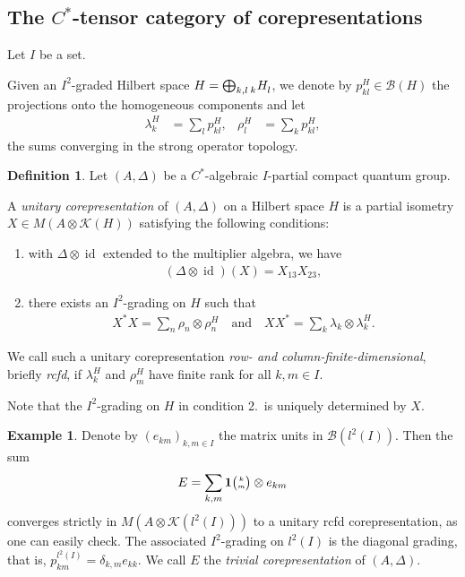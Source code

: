 \documentclass[11pt]{article}
\DeclareMathOperator{\id}{id}
\newcommand{\Grt}[3]{#1{\tiny {\begin{pmatrix} #2\\#3\end{pmatrix}}}}
\newcommand{\UnitC}[2]{\Grt{\mathbf{1}}{#1}{#2}}
\newcommand{\Gr}[5]{\tensor*[^{#2}_{#4}]{#1}{^{#3}_{#5}}}%
\newcommand{\Grd}[3]{\Gr{#1}{}{}{#2}{#3}}
\theoremstyle{definition}
\newtheorem{Def}[Theorem]{Definition}
\newtheorem{Exa}[Theorem]{Example}
\numberwithin{equation}{section}
\begin{document}
\subsection{The $C^{*}$-tensor category of corepresentations}
Let $I$ be a set.

Given an $I^{2}$-graded Hilbert space
$H=\bigoplus_{k,l} \Grd{H}{k}{l}$, we denote by
$p_{kl}^{H} \in \mathcal{B}(H)$ the projections onto the homogeneous components and let
\begin{align*}
  \lambda^{H}_{k} &= \sum_{l} p_{kl}^{H}, &
  \rho^{H}_{l} &= \sum_{k} p_{kl}^{H},
\end{align*}
 the sums converging in the strong operator topology.


 \begin{Def} \label{def:corepresentation} Let $(A,\Delta)$ be a
   $C^{*}$-algebraic $I$-partial compact quantum group. 

   A \emph{unitary corepresentation} of $(A,\Delta)$ on a Hilbert
   space $H$ is a partial isometry $X \in M(A \otimes \mathcal{K}(H))$
   satisfying the following conditions:
   \begin{enumerate}
   \item with $\Delta \otimes \id$ extended to the multiplier algebra, we have
     \begin{align} \label{eq:corep}
     (\Delta \otimes \id)(X) = X_{13}X_{23},  
   \end{align}
 \item there exists an $I^{2}$-grading on $H$ such that
     \begin{align} \label{eq:corep-pi}
       X^{*}X= \sum_{n}\rho_{n} \otimes \rho^{H}_{n} \quad \text{and}
       \quad XX^{*} = \sum_{k} \lambda_{k} \otimes \lambda^{H}_{k}.
     \end{align}
   \end{enumerate}
   We call such a unitary corepresentation \emph{row- and column-finite-dimensional}, briefly
   \emph{rcfd}, if $\lambda^{H}_{k}$ and $\rho^{H}_{m}$ have finite rank for all $k,m\in I$.
\end{Def}
Note that the $I^{2}$-grading on $H$ in  condition 2.\ is uniquely
determined by $X$.

\begin{Exa} \label{exa:corep-trivial}
  Denote by $(e_{km})_{k,m\in I}$ the matrix units in $\mathcal{B}(l^{2}(I))$. Then the sum
  \begin{align*}
    E = \sum_{k,m} \UnitC{k}{m} \otimes e_{km} 
  \end{align*}
  converges strictly in $M(A\otimes \mathcal{K}(l^{2}(I)))$ to a unitary rcfd corepresentation, as
  one can easily check. The associated $I^{2}$-grading on $l^{2}(I)$ is the diagonal grading, that
  is, $p^{l^{2}(I)}_{km} =\delta_{k,m} e_{kk}$. We call $E$ the \emph{trivial corepresentation} of
  $(A,\Delta)$.
\end{Exa}
\end{document}

